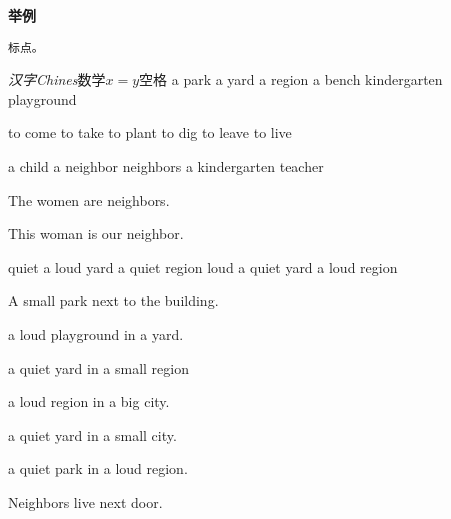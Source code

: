 \documentclass[11pt]{ctexart}
\begin{document}
\huge\bf{举例}
\begin{verbatim}
标点。
\end{verbatim}
\textit{汉字}\textit{Chines}数学$x=y$空格
a park a yard a region a bench kindergarten playground

to come to take to plant to dig to leave to live

a child a neighbor neighbors a kindergarten teacher

The women are neighbors.

This woman is our neighbor.

quiet a loud yard a quiet region loud a quiet yard a loud region

A small park next to the building.

a loud playground in a yard.

a quiet yard in a small region

a loud region in a big city.

a quiet yard in a small city.

a quiet park in a loud region.

Neighbors live next door.
\end{document}
